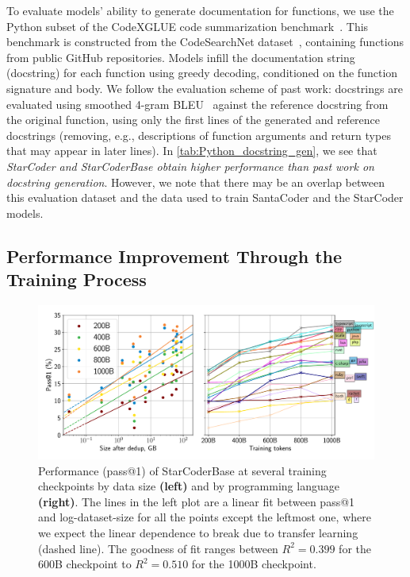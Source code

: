 \documentclass[10pt]{article} %
\begin{document}
To evaluate models' ability to generate documentation for functions, we use the Python subset of the CodeXGLUE code summarization benchmark~\citep{lu2021codexglue}. This benchmark is constructed from the CodeSearchNet dataset~\citep{husain2019codesearchnet}, containing functions from public GitHub repositories.
Models infill the documentation string (docstring) for each function using greedy decoding, conditioned on the function signature and body. We follow the evaluation scheme of past work: docstrings are evaluated using smoothed 4-gram BLEU~\citep{papineni2002bleu} against the reference docstring from the original function, using only the first lines of the generated and reference docstrings (removing, e.g., descriptions of function arguments and return types that may appear in later lines).
In \autoref{tab:Python_docstring_gen}, we see that \emph{StarCoder and StarCoderBase obtain higher performance than past work on docstring generation}. %
However, we note that there may be an overlap between this evaluation dataset and the data used to train SantaCoder and the StarCoder models.

\subsection{Performance Improvement Through the Training Process}
\begin{figure}
    \centering
\includegraphics[width=\linewidth]{figures/performance.pdf}
	\caption{Performance (pass@1) of StarCoderBase at several training checkpoints  by data size \textbf{(left)} and by programming language \textbf{(right)}. The lines in the left plot are a linear fit between pass@1 and log-dataset-size for all the points except the leftmost one, where we expect the linear dependence to break due to transfer learning (dashed line). The goodness of fit ranges between $R^2=0.399$ for the 600B checkpoint to $R^2=0.510$ for the 1000B checkpoint. }
        \label{checkpoint-perf}
\end{figure}
\end{document}
